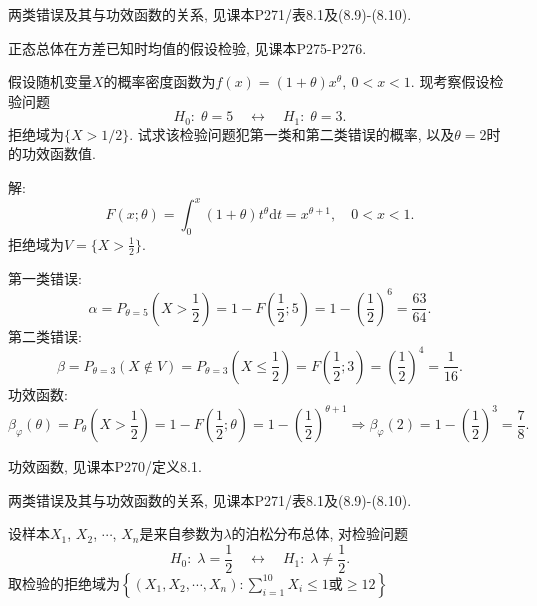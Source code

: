 \documentclass[standard]{ExBook}
\renewenvironment{shaded}{%
  \def\FrameCommand{\fboxsep=\FrameSep \colorbox{shadecolor}}%
  \MakeFramed{\advance\hsize-\width \FrameRestore}%
}{%
  \endMakeFramed
}
\begin{document}
\begin{qitems}
\textcolor{themeColor}{\selectfont {} 两类错误及其与功效函数的关系, 见课本P271/表8.1及(8.9)-(8.10).}

\textcolor{themeColor}{\selectfont {} 正态总体在方差已知时均值的假设检验, 见课本P275-P276.}

\vspace{2.5cm-5em}

    \begin{bbox} 
    \begin{shaded}
        \qitem
假设随机变量$X$的概率密度函数为$f(x) = (1 + \theta)x^{\theta},\ 0 < x < 1$. 现考察假设检验问题
\[
H_0: \; \theta = 5 \quad \longleftrightarrow \quad H_1: \; \theta = 3.
\]
拒绝域为$\{X > 1/2\}$. 试求该检验问题犯第一类和第二类错误的概率, 以及$\theta = 2$时的功效函数值.
    \end{shaded}
    \end{bbox}

\vspace{\dimexpr2.5cm-5em\relax}

解:
$$
F(x;\theta)
=\int_{0}^{x}(1+\theta)t^{\theta}\mathrm{d}t
=x^{\theta+1},\quad 0<x<1.
$$
拒绝域为$V=\{X>\frac{1}{2}\}$.

第一类错误:
$$
\alpha
=P_{\theta=5}\left(X>\frac{1}{2}\right)
=1-F\left(\frac{1}{2};5\right)
=1-\left(\frac{1}{2}\right)^6
=\frac{63}{64}.
$$
第二类错误:
$$
\beta
=P_{\theta=3}\left(X\notin V\right)
=P_{\theta=3}\left(X\leq\frac{1}{2}\right)
=F\left(\frac{1}{2};3\right)
=\left(\frac{1}{2}\right)^4
=\frac{1}{16}.
$$
功效函数:
$$
\beta_{\varphi}(\theta)
=P_{\theta}\left(X>\frac{1}{2}\right)
=1-F\left(\frac{1}{2};\theta\right)
=1-\left(\frac{1}{2}\right)^{\theta+1}
\Longrightarrow
\beta_{\varphi}(2)
=1-\left(\frac{1}{2}\right)^3
=\frac{7}{8}.
$$

\textcolor{themeColor}{\selectfont {} 功效函数, 见课本P270/定义8.1.}

\textcolor{themeColor}{\selectfont {} 两类错误及其与功效函数的关系, 见课本P271/表8.1及(8.9)-(8.10).}

\vspace{2.5cm-5em}

    \begin{bbox} 
    \begin{shaded}
        \qitem
设样本$X_1$, $X_2$, $\cdots$, $X_n$是来自参数为$\lambda$的泊松分布总体, 对检验问题
\[
H_0: \; \lambda = \displaystyle\frac{1}{2} \quad \longleftrightarrow \quad H_1: \; \lambda \neq \displaystyle\frac{1}{2}.
\]
取检验的拒绝域为$\left\{\left(X_1,X_2,\cdots,X_n\right): \displaystyle\sum\limits_{i=1}^{10}X_{i} \leq 1 \text{或} \geq 12\right\}$


\end{shaded}
\end{bbox}
\end{qitems}
\end{document}
